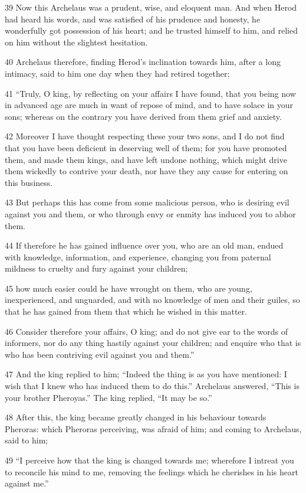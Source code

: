 39 Now this Archelaus was a prudent, wise, and eloquent man. And when Herod had heard his words, and was satisfied of his prudence and honesty, he wonderfully got possession of his heart; and he trusted himself to him, and relied on him without the slightest hesitation. 

40 Archelaus therefore, finding Herod’s inclination towards him, after a long intimacy, said to him one day when they had retired together; 

41 “Truly, O king, by reflecting on your affairs I have found, that you being now in advanced age are much in want of repose of mind, and to have solace in your sons; whereas on the contrary you have derived from them grief and anxiety. 

42 Moreover I have thought respecting these your two sons, and I do not find that you have been deficient in deserving well of them; for you have promoted them, and made them kings, and have left undone nothing, which might drive them wickedly to contrive your death, nor have they any cause for entering on this business. 

43 But perhaps this has come from some malicious person, who is desiring evil against you and them, or who through envy or enmity has induced you to abhor them. 

44 If therefore he has gained influence over you, who are an old man, endued with knowledge, information, and experience, changing you from paternal mildness to cruelty and fury against your children; 

45 how much easier could he have wrought on them, who are young, inexperienced, and unguarded, and with no knowledge of men and their guiles, so that he has gained from them that which he wished in this matter. 

46 Consider therefore your affairs, O king; and do not give ear to the words of informers, nor do any thing hastily against your children; and enquire who that is who has been contriving evil against you and them.” 

47 And the king replied to him; “Indeed the thing is as you have mentioned: I wish that I knew who has induced them to do this.” Archelaus answered, “This is your brother Pheroyas.” The king replied, “It may be so.” 

48 After this, the king became greatly changed in his behaviour towards Pheroras: which Pheroras perceiving, was afraid of him; and coming to Archelaus, said to him; 

49 “I perceive how that the king is changed towards me; wherefore I intreat you to reconcile his mind to me, removing the feelings which he cherishes in his heart against me.” 

